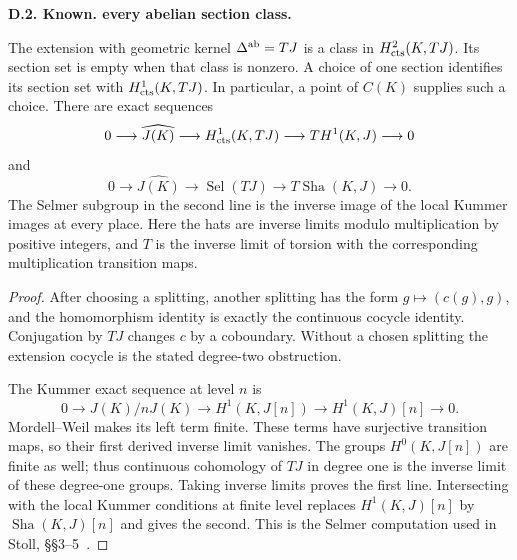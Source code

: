 \documentclass[11pt,oneside]{article}
\makeatletter
\newcommand{\Sha}{\operatorname{Sha}}
\newcounter{statementanchor}
\newenvironment{statement}[3]{%
 \refstepcounter{statementanchor}\def\@currentlabel{#1}%
 \par\addvspace{9pt}\noindent
 \textbf{#1. #2. #3.}\par\nobreak\noindent\ignorespaces
}{\par\addvspace{5pt}}
\makeatother
\begin{document}
\begin{statement}{D.2}{Known}{every abelian section class}
\label{st:D.2}
\label{D-abelian}
The extension with geometric kernel $\Delta^{\rm ab}=TJ$
is a class in $H^2_{\rm cts}(K,TJ)$. Its section set is
empty when that class is nonzero. A choice of one
section identifies its section set with
$H^1_{\rm cts}(K,TJ)$. In particular, a point of $C(K)$
supplies such a choice. There are exact sequences
\[
 0\longrightarrow\widehat{J(K)}
 \longrightarrow H^1_{\rm cts}(K,TJ)
 \longrightarrow T H^1(K,J)\longrightarrow0
\]
and
\[
 0\longrightarrow\widehat{J(K)}
 \longrightarrow\operatorname{Sel}(TJ)
 \longrightarrow T\Sha(K,J)\longrightarrow0.
\]
The Selmer subgroup in the second line is the inverse
image of the local Kummer images at every place.
Here the hats are inverse limits modulo multiplication
by positive integers, and $T$ is the inverse limit
of torsion with the corresponding multiplication
transition maps.
\end{statement}
\begin{proof}
After choosing a splitting, another splitting has
the form $g\mapsto(c(g),g)$, and the homomorphism
identity is exactly the continuous cocycle identity.
Conjugation by $TJ$ changes $c$ by a coboundary.
Without a chosen splitting the extension cocycle is
the stated degree-two obstruction.

The Kummer exact sequence at level $n$ is
\[
 0\longrightarrow J(K)/nJ(K)
 \longrightarrow H^1(K,J[n])
 \longrightarrow H^1(K,J)[n]\longrightarrow0.
\]
Mordell--Weil makes its left term finite. These terms
have surjective transition maps, so their first
derived inverse limit vanishes. The groups
$H^0(K,J[n])$ are finite as well; thus continuous
cohomology of $TJ$ in degree one is the inverse
limit of these degree-one groups. Taking inverse
limits proves the first line. Intersecting with the
local Kummer conditions at finite level replaces
$H^1(K,J)[n]$ by $\Sha(K,J)[n]$ and gives the second.
This is the Selmer computation used in Stoll,
\S\S3--5~\cite{Stoll2007}.
\end{proof}
\end{document}
